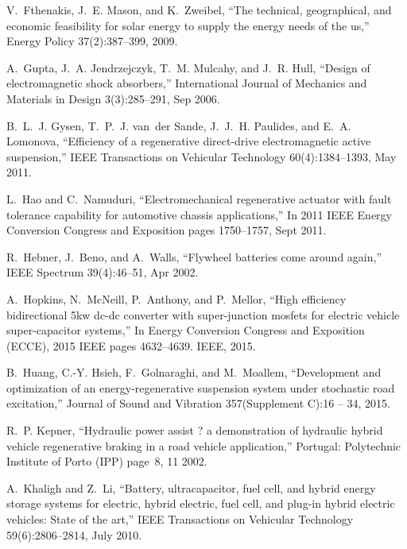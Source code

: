 V.~Fthenakis, J.~E. Mason, and K.~Zweibel,
\newblock ``The technical, geographical, and economic feasibility for solar
  energy to supply the energy needs of the us,''
\newblock Energy Policy 37(2):387--399, 2009.

A.~Gupta, J.~A. Jendrzejczyk, T.~M. Mulcahy, and J.~R. Hull,
\newblock ``Design of electromagnetic shock absorbers,''
\newblock International Journal of Mechanics and Materials in Design
  3(3):285--291, Sep 2006.

B.~L.~J. Gysen, T.~P.~J. van~der Sande, J.~J.~H. Paulides, and E.~A. Lomonova,
\newblock ``Efficiency of a regenerative direct-drive electromagnetic active
  suspension,''
\newblock IEEE Transactions on Vehicular Technology 60(4):1384--1393,
  May 2011.

L.~Hao and C.~Namuduri,
\newblock ``Electromechanical regenerative actuator with fault tolerance
  capability for automotive chassis applications,''
\newblock In 2011 IEEE Energy Conversion Congress and Exposition pages
  1750--1757, Sept 2011.

R.~Hebner, J.~Beno, and A.~Walls,
\newblock ``Flywheel batteries come around again,''
\newblock IEEE Spectrum 39(4):46--51, Apr 2002.

A.~Hopkins, N.~McNeill, P.~Anthony, and P.~Mellor,
\newblock ``High efficiency bidirectional 5kw dc-dc converter with super-junction
  mosfets for electric vehicle super-capacitor systems,''
\newblock In Energy Conversion Congress and Exposition (ECCE), 2015 IEEE
  pages 4632--4639. IEEE, 2015.

B.~Huang, C.-Y. Hsieh, F.~Golnaraghi, and M.~Moallem,
\newblock ``Development and optimization of an energy-regenerative suspension
  system under stochastic road excitation,''
\newblock Journal of Sound and Vibration 357(Supplement C):16 -- 34,
  2015.

R.~P. Kepner,
\newblock ``Hydraulic power assist ? a demonstration of hydraulic hybrid vehicle
  regenerative braking in a road vehicle application,''
\newblock Portugal: Polytechnic Institute of Porto (IPP) page~8, 11
  2002.

A.~Khaligh and Z.~Li,
\newblock ``Battery, ultracapacitor, fuel cell, and hybrid energy storage systems
  for electric, hybrid electric, fuel cell, and plug-in hybrid electric
  vehicles: State of the art,''
\newblock IEEE Transactions on Vehicular Technology 59(6):2806--2814,
  July 2010.

